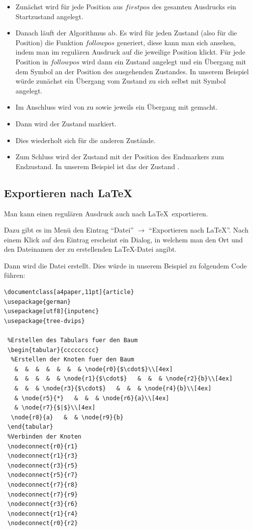 \begin{itemize}

   \item Zunächst wird für jede Position aus $firstpos$ des gesamten Ausdrucks ein Startzustand angelegt.
   \item Danach läuft der Algorithmus ab. Es wird für jeden Zustand (also für die Position) die Funktion $followpos$ generiert, diese kann man sich ansehen, indem man im regulären Ausdruck auf die jeweilige Position klickt. Für jede Position in $followpos$ wird dann ein Zustand angelegt und ein Übergang mit dem Symbol an der Position des ausgehenden Zustandes. In unserem Beispiel würde zunächst ein Übergang vom Zustand  zu sich selbst mit Symbol  angelegt.
   \item Im Anschluss wird von  zu  sowie  jeweils ein Übergang mit  gemacht.
   \item Dann wird der Zustand  markiert.
   \item Dies wiederholt sich für die anderen Zustände.
   \item Zum Schluss wird der Zustand mit der Position des Endmarkers zum Endzustand. In unserem Beispiel ist das der Zustand .

\end{itemize}

\subsection{Exportieren nach \LaTeX}

Man kann einen regulären Ausdruck auch nach \LaTeX \ exportieren.

Dazu gibt es im Menü den Eintrag "`Datei"' $\rightarrow$ "`Exportieren nach LaTeX"'. Nach einem Klick auf den Eintrag erscheint ein Dialog, in welchem man den Ort und den Dateinamen der zu erstellenden \LaTeX-Datei angibt.

Dann wird die Datei erstellt. Dies würde in unserem Beispiel zu folgendem Code führen:
\begin{lstlisting}
\documentclass[a4paper,11pt]{article}
\usepackage{german}
\usepackage[utf8]{inputenc}
\usepackage{tree-dvips}

 %Erstellen des Tabulars fuer den Baum
 \begin{tabular}{ccccccccc}
  %Erstellen der Knoten fuer den Baum
   &  &  &  &  &  &  & \node{r0}{$\cdot$}\\[4ex]
   &  &  &  &  & \node{r1}{$\cdot$}   &  &  & \node{r2}{b}\\[4ex]
   &  &  & \node{r3}{$\cdot$}   &  &  & \node{r4}{b}\\[4ex]
   & \node{r5}{*}   &  &  & \node{r6}{a}\\[4ex]
   & \node{r7}{$|$}\\[4ex]
  \node{r8}{a}   &  & \node{r9}{b}
 \end{tabular}
 %Verbinden der Knoten
 \nodeconnect{r0}{r1}
 \nodeconnect{r1}{r3}
 \nodeconnect{r3}{r5}
 \nodeconnect{r5}{r7}
 \nodeconnect{r7}{r8}
 \nodeconnect{r7}{r9}
 \nodeconnect{r3}{r6}
 \nodeconnect{r1}{r4}
 \nodeconnect{r0}{r2}


\end{lstlisting}

